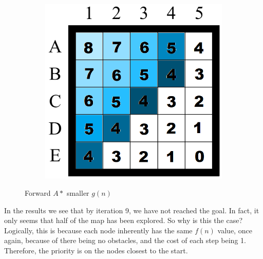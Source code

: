 \begin{figure}[H]
\begin{subfigure}[b]{.3\textwidth}
\end{subfigure}
\begin{subfigure}[b]{.3\textwidth}
  \centering
  \includegraphics[width=0.95\linewidth]{Report/Part2/g tie breaker/smaller g/9.png}  
\end{subfigure}


\caption{Forward $A*$ smaller $g(n)$}
\end{figure}

In the results we see that by iteration 9, we have not reached the goal. In fact, it only seems that half of the map has been explored. So why is this the case? Logically, this is because each node inherently has the same $f(n)$ value, once again, because of there being no obstacles, and the cost of each step being 1. Therefore, the priority is on the nodes closest to the start.


